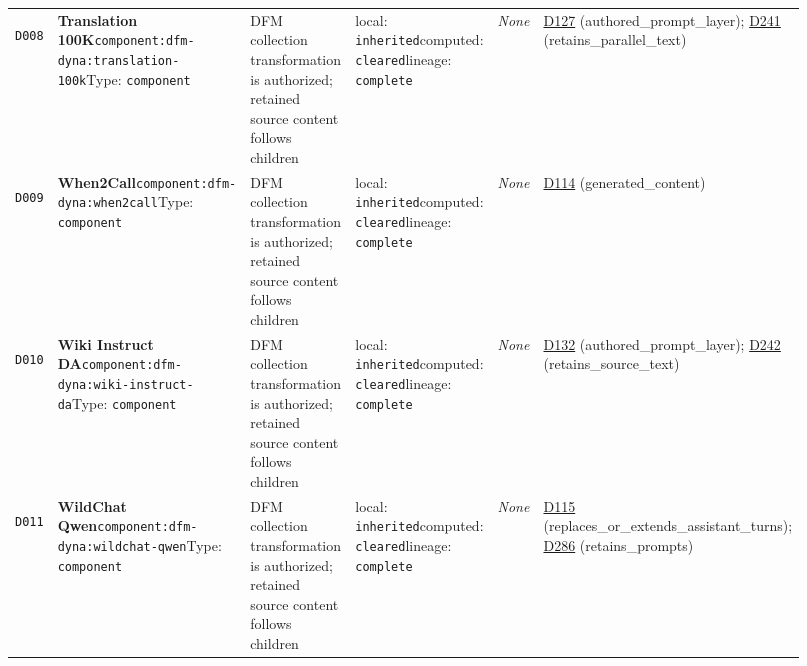 \documentclass[9pt,a4paper]{article}
\newcommand{\depid}[1]{\hypertarget{dep:#1}{\texttt{#1}}}
\begin{document}
\begin{landscape}
\begin{longtable}{@{}L{0.035\linewidth}L{0.185\linewidth}L{0.27\linewidth}L{0.09\linewidth}L{0.10\linewidth}L{0.24\linewidth}@{}}
\depid{D008} & \textbf{Translation 100K}\newline \nolinkurl{component:dfm-dyna:translation-100k}\newline Type: \texttt{component} & DFM collection transformation is authorized; retained source content follows children & local: \texttt{inherited}\newline computed: \texttt{cleared}\newline lineage: \texttt{complete} & \textit{None} & \hyperlink{dep:D127}{D127} (authored\_prompt\_layer); \hyperlink{dep:D241}{D241} (retains\_parallel\_text) \\
\depid{D009} & \textbf{When2Call}\newline \nolinkurl{component:dfm-dyna:when2call}\newline Type: \texttt{component} & DFM collection transformation is authorized; retained source content follows children & local: \texttt{inherited}\newline computed: \texttt{cleared}\newline lineage: \texttt{complete} & \textit{None} & \hyperlink{dep:D114}{D114} (generated\_content) \\
\depid{D010} & \textbf{Wiki Instruct DA}\newline \nolinkurl{component:dfm-dyna:wiki-instruct-da}\newline Type: \texttt{component} & DFM collection transformation is authorized; retained source content follows children & local: \texttt{inherited}\newline computed: \texttt{cleared}\newline lineage: \texttt{complete} & \textit{None} & \hyperlink{dep:D132}{D132} (authored\_prompt\_layer); \hyperlink{dep:D242}{D242} (retains\_source\_text) \\
\depid{D011} & \textbf{WildChat Qwen}\newline \nolinkurl{component:dfm-dyna:wildchat-qwen}\newline Type: \texttt{component} & DFM collection transformation is authorized; retained source content follows children & local: \texttt{inherited}\newline computed: \texttt{cleared}\newline lineage: \texttt{complete} & \textit{None} & \hyperlink{dep:D115}{D115} (replaces\_or\_extends\_assistant\_turns); \hyperlink{dep:D286}{D286} (retains\_prompts) \\

\end{longtable}
\end{landscape}
\end{document}
